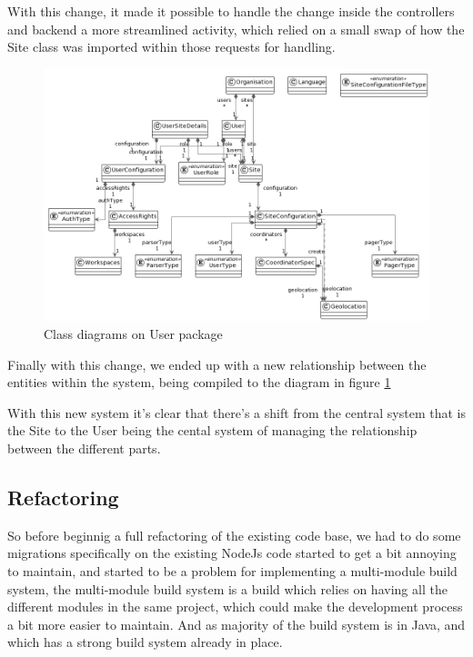 With this change, it made it possible to handle the change inside the controllers and
backend a more streamlined activity, which relied on a small swap of how the Site 
class was imported within those requests for handling.

\begin{figure}
    \centering
    \includegraphics[width=\textwidth]{images/package.png}
    \caption{\footnotesize{Class diagrams on User package}}
    \label{fig:cd_entities}
\end{figure}

Finally with this change, we ended up with a new relationship between the entities
within the system, being compiled to the diagram in figure \ref{fig:cd_entities}

With this new system it's clear that there's a shift from the central system
that is the Site to the User being the cental system of managing the relationship
between the different parts.

\subsection {Refactoring}

So before beginnig a full refactoring of the existing code base, we had to do some migrations
specifically on the existing NodeJs code started to get a bit annoying to maintain, and
started to be a problem for implementing a multi-module build system, the multi-module build
system is a build which relies on having all the different modules in the same project,
which could make the development process a bit more easier to maintain. And as majority
of the build system is in Java, and which has a strong build system already in place.

